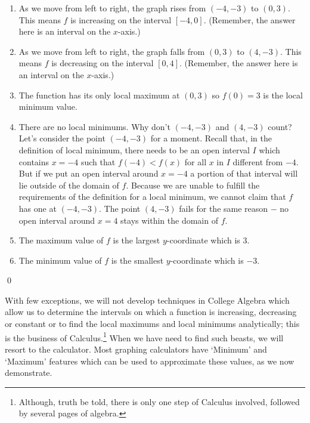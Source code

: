 \begin{ex}
\begin{enumerate}
\item  As we move from left to right, the graph rises from $(-4,-3)$ to $(0,3)$.  This means $f$ is increasing on the interval $[-4,0]$.  (Remember, the answer here is an interval on the $x$-axis.)

\item  As we move from left to right, the graph falls from $(0,3)$ to $(4,-3)$.  This means $f$ is decreasing on the interval $[0,4]$.  (Remember, the answer here is an interval on the $x$-axis.)

\item  The function has its only local maximum at $(0,3)$ so $f(0) = 3$ is the local minimum value.

\item  There are no local minimums.  Why don't $(-4, -3)$ and $(4, -3)$ count?  Let's consider the point $(-4, -3)$ for a moment.  Recall that, in the definition of local minimum, there needs to be an open interval $I$ which contains $x = -4$ such that $f(-4) < f(x)$ for all $x$ in $I$ different from $-4$.  But if we put an open interval around $x= -4$ a portion of that interval will lie outside of the domain of $f$.  Because we are unable to fulfill the requirements of the definition for a local minimum, we cannot claim that $f$ has one at $(-4, -3)$.  The point $(4, -3)$ fails for the same reason $-$ no open interval around $x = 4$ stays within the domain of $f$.

\item  The maximum value of $f$ is the largest $y$-coordinate which is $3$.

\item  The minimum value of $f$ is the smallest $y$-coordinate which is $-3$.

\end{enumerate}

\end{ex} 

\vspace{-.32in} \qed

\smallskip

With few exceptions, we will not develop techniques in College Algebra which allow us to determine the intervals on which a function is increasing, decreasing or constant or to find the local maximums and local minimums analytically;  this is the business of Calculus.\footnote{Although, truth be told, there is only one step of Calculus involved, followed by several pages of algebra.}  When we have need to find such beasts, we will resort to the calculator.  Most graphing calculators have `Minimum' and `Maximum' features which can be used to approximate these values, as we now demonstrate.


